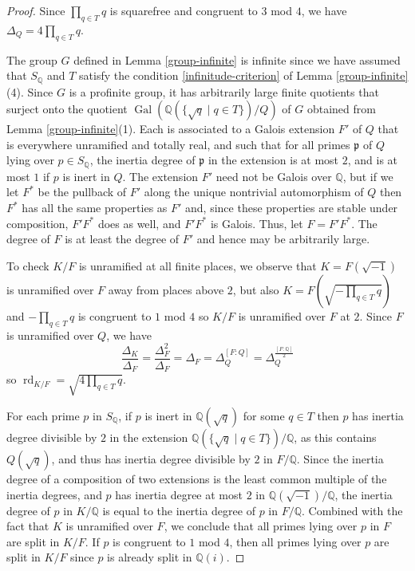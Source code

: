 \documentclass[12pt]{amsart}
\newcommand{\Gal}{\operatorname{Gal}}
\theoremstyle{remark}
\theoremstyle{definition}
\begin{document}
 \begin{proof} Since $\prod_{q\in T} q$ is squarefree and congruent to $3$ mod $4$, we have $\Delta_Q = 4 \prod_{q\in T} q$.
 
 The group $G$ defined in Lemma \ref{group-infinite} is infinite since we have assumed that $S_\mathbb Q$ and $T$ satisfy the condition \eqref{infinitude-criterion} of Lemma \ref{group-infinite}(4). Since $G$ is a profinite group, it has arbitrarily large finite quotients that surject onto the quotient $\Gal(\mathbb Q( \{\sqrt{q} \mid q \in T\})/Q)$ of $G$ obtained from Lemma \ref{group-infinite}(1). Each is associated to a Galois extension $F'$ of $Q$ that is everywhere unramified and totally real, and such that for all primes $\mathfrak p$ of $Q$ lying over $p \in S_{\mathbb Q}$, the inertia degree of $\mathfrak p$ in the extension is at most $2$, and is at most $1$ if $p$ is inert in $Q$. The extension $F'$ need not be Galois over $\mathbb Q$, but if we let $F^*$ be the pullback of $F'$ along the unique nontrivial automorphism of $Q$ then $F^*$ has all the same properties as $F'$ and, since these properties are stable under composition, $F' F^*$ does as well, and $F' F^*$ is Galois. Thus, let $F = F' F^*$. The degree of $F$ is at least the degree of $F'$ and hence may be arbitrarily large.
 
To check $K/F$ is unramified at all finite places, we observe that $K = F(\sqrt{-1})$ is unramified over $F$ away from places above $2$, but also $K=F(\sqrt{ -\prod_{q\in T}q})$ and $-\prod_{q\in T}q$ is congruent to $1$ mod $4$ so $ K/F$ is unramified over $F$ at $2$. Since $F$ is unramified over $Q$, we have
\[ \frac{\Delta_K}{\Delta_F}  = \frac{\Delta_F^2}{\Delta_F}=\Delta_F = \Delta_Q^{[F:Q]}= \Delta_Q^{\frac{[F:\mathbb Q]}{2}}\]
so $\operatorname{rd}_{K/F} = \sqrt{ 4 \prod_{q\in T} q}$.

For each prime $p$ in $S_{\mathbb Q}$, if $p$ is inert in $\mathbb Q(\sqrt{q})$ for some $q\in T$ then $p$ has inertia degree divisible by $2$ in the extension $\mathbb Q( \{\sqrt{q} \mid q \in T\})/\mathbb Q$, as this contains $Q(\sqrt{q})$, and thus has inertia degree divisible by $2$ in $F/\mathbb Q$. Since the inertia degree of a composition of two extensions is the least common multiple of the inertia degrees, and $p$ has inertia degree at most $2$ in $\mathbb Q(\sqrt{-1})/\mathbb Q$, the inertia degree of $p$ in $K/\mathbb Q$ is equal to the inertia degree of $p$ in $F/\mathbb Q$. Combined with the fact that $K$ is unramified over $F$, we conclude that all primes lying over $p$ in $F$ are split in $K/F$.  If $p$ is congruent to $1$ mod $4$, then all primes lying over $p$ are split in $K/F$ since $p$ is already split in $\mathbb Q(i)$. 


\end{proof}
\end{document}

